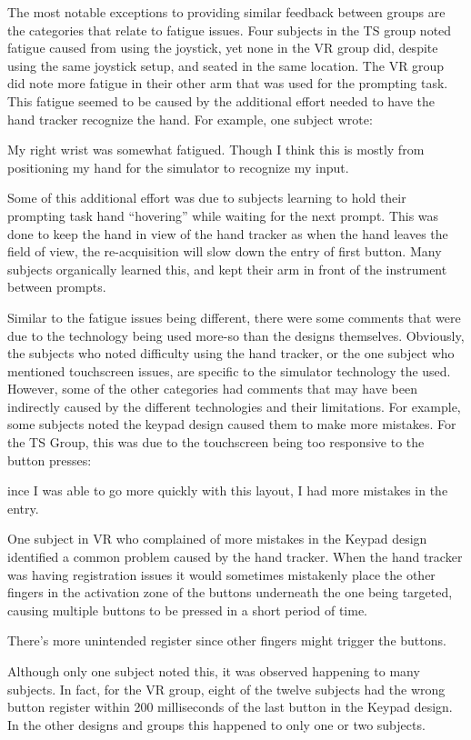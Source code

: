 The most notable exceptions to providing similar feedback between groups are the categories that relate to fatigue issues.
Four subjects in the TS group noted fatigue caused from using the joystick, yet none in the VR group did, despite using the same joystick setup, and seated in the same location.
The VR group did note more fatigue in their other arm that was used for the prompting task.
This fatigue seemed to be caused by the additional effort needed to have the hand tracker recognize the hand.
For example, one subject wrote:
\begin{displayquote}[VR Subject]
    My right wrist was somewhat fatigued.  Though I think this is mostly from positioning my hand for the simulator to recognize my input.
\end{displayquote}
Some of this additional effort was due to subjects learning to hold their prompting task hand ``hovering'' while waiting for the next prompt.
This was done to keep the hand in view of the hand tracker as when the hand leaves the field of view, the re-acquisition will slow down the entry of first button.
Many subjects organically learned this, and kept their arm in front of the instrument between prompts.

Similar to the fatigue issues being different, there were some comments that were due to the technology being used more-so than the designs themselves.
Obviously, the subjects who noted difficulty using the hand tracker, or the one subject who mentioned touchscreen issues, are specific to the simulator technology the used.
However, some of the other categories had comments that may have been indirectly caused by the different technologies and their limitations.
For example, some subjects noted the keypad design caused them to make more mistakes.
For the TS Group, this was due to the touchscreen being too responsive to the button presses:
\begin{displayquote}[TS Subject]
    ince I was able to go more quickly with this layout, I had more mistakes in the entry.
\end{displayquote}
One subject in VR who complained of more mistakes in the Keypad design identified a common problem caused by the hand tracker.
When the hand tracker was having registration issues it would sometimes mistakenly place the other fingers in the activation zone of the buttons underneath the one being targeted, causing multiple buttons to be pressed in a short period of time.
\begin{displayquote}[VR Subject]
    There's more unintended register since other fingers might trigger the buttons.
\end{displayquote}
Although only one subject noted this, it was observed happening to many subjects.
In fact, for the VR group, eight of the twelve subjects had the wrong button register within 200 milliseconds of the last button in the Keypad design.
In the other designs and groups this happened to only one or two subjects.


